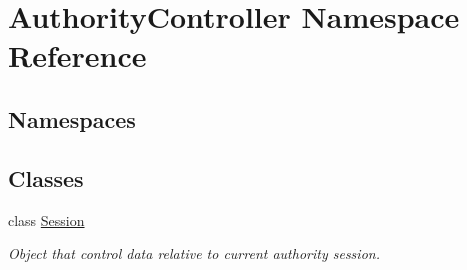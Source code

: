 \hypertarget{namespace_authority_controller}{}\section{Authority\+Controller Namespace Reference}
\label{namespace_authority_controller}
\subsection*{Namespaces}
\begin{DoxyCompactItemize}
\end{DoxyCompactItemize}
\subsection*{Classes}
\begin{DoxyCompactItemize}
\item 
class \mbox{\hyperlink{class_authority_controller_1_1_session}{Session}}
\begin{DoxyCompactList}\small\item\em Object that control data relative to current authority session. \end{DoxyCompactList}\end{DoxyCompactItemize}
